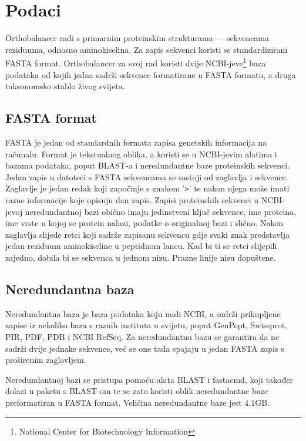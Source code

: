 \chapter{Podaci}
\label{chap:podaci}

Orthobalancer radi s primarnim proteinskim strukturama --- sekvencama
reziduuma, odnosno aminokiselina. Za zapis sekvenci koristi se standardizirani
FASTA format. Orthobalancer za svoj rad koristi dvije
NCBI-jeve\footnote{National Center for Biotechnology Information} baza
podataka od kojih jedna sadrži sekvence formatirane u FASTA formatu, a druga
taksonomsko stablo živog svijeta.


\section{FASTA format}
\label{sec:fasta}

FASTA je jedan od standardnih formata zapisa genetskih informacija na računalu.
Format je tekstualnog oblika, a koristi se u NCBI-jevim alatima i bazama
podataka, poput BLAST-a i neredundantne baze proteinskih sekvenci. Jedan zapis u
datoteci s FASTA sekvencama se sastoji od zaglavlja i sekvence. Zaglavlje je
jedan redak koji započinje s znakom '\texttt{>}' te nakon njega može imati razne
informacije koje opisuju dan zapis. Zapisi proteinskih sekvenci u NCBI-jevoj
neredundantnoj bazi obično imaju jedinstveni ključ sekvence, ime proteina, ime
vrste u kojoj se protein nalazi, podatke o originalnoj bazi i slično. Nakon
zaglavlja slijede retci koji sadrže zapisanu sekvencu gdje svaki znak
predstavlja jedan reziduum aminokiseline u peptidnom lancu. Kad bi ti se retci
slijepili zajedno, dobila bi se sekvenca u jednom nizu. Prazne linije nisu
dopuštene.


\section{Neredundantna baza}
\label{sec:nrdb}

Neredundantna baza je baza podataka koju nudi NCBI, a sadrži prikupljene zapise
iz nekoliko baza s raznih instituta u svijetu, poput GenPept, Swissprot, PIR,
PDF, PDB i NCBI RefSeq. Za neredundantnu bazu se garantira da ne sadrži dvije
jednake sekvence, već se one tada spajaju u jedan FASTA zapis s proširenim
zaglavljem.

Neredundantnoj bazi se pristupa pomoću alata BLAST\cite{altschul1997gapped} i
fastacmd, koji također dolazi u paketu s BLAST-om te se zato koristi oblik
neredundantne baze preformatiran u FASTA format. Veličina neredundantne baze
jest $4.1$GB.


